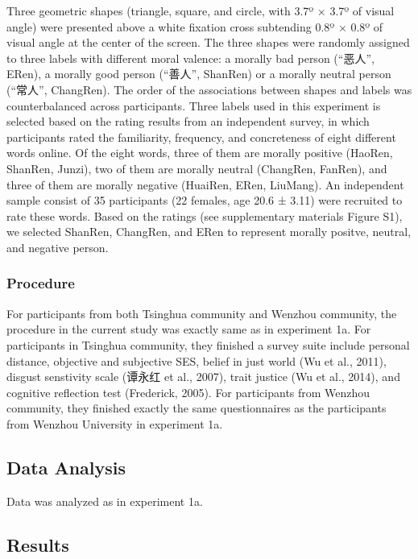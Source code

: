 \documentclass[man]{apa6}
\begin{document}
Three geometric shapes (triangle, square, and circle, with 3.7º × 3.7º of visual angle) were presented above a white fixation cross subtending 0.8º × 0.8º of visual angle at the center of the screen. The three shapes were randomly assigned to three labels with different moral valence: a morally bad person (\enquote{恶人}, ERen), a morally good person (\enquote{善人}, ShanRen) or a morally neutral person (\enquote{常人}, ChangRen). The order of the associations between shapes and labels was counterbalanced across participants.
Three labels used in this experiment is selected based on the rating results from an independent survey, in which participants rated the familiarity, frequency, and concreteness of eight different words online. Of the eight words, three of them are morally positive (HaoRen, ShanRen, Junzi), two of them are morally neutral (ChangRen, FanRen), and three of them are morally negative (HuaiRen, ERen, LiuMang). An independent sample consist of 35 participants (22 females, age 20.6 ± 3.11) were recruited to rate these words. Based on the ratings (see supplementary materials Figure S1), we selected ShanRen, ChangRen, and ERen to represent morally positve, neutral, and negative person.

\hypertarget{procedure-1}{%
\subsubsection{Procedure}\label{procedure-1}}

For participants from both Tsinghua community and Wenzhou community, the procedure in the current study was exactly same as in experiment 1a. For participants in Tsinghua community, they finished a survey suite include personal distance, objective and subjective SES, belief in just world (Wu et al., 2011), disgust senstivity scale (谭永红 et al., 2007), trait justice (Wu et al., 2014), and cognitive reflection test (Frederick, 2005). For participants from Wenzhou community, they finished exactly the same questionnaires as the participants from Wenzhou University in experiment 1a.

\hypertarget{data-analysis-1}{%
\subsection{Data Analysis}\label{data-analysis-1}}

Data was analyzed as in experiment 1a.

\hypertarget{results-1}{%
\subsection{Results}\label{results-1}}
\end{document}
